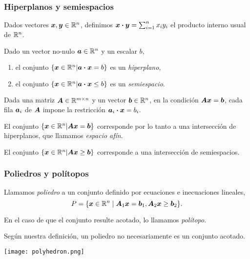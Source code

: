 \documentclass[aspectratio=169,12pt,spanish]{beamer}
\begin{document}

\begin{frame}
\frametitle{Hiperplanos y semiespacios}

Dados vectores $\bm{x}, \bm{y} \in \mathbb{R}^n$, definimos $\bm{x} \boldsymbol{\cdot} \bm{y} = \sum_{i=1}^n x_i y_i$ el producto interno usual de $\mathbb{R}^n$.

\begin{definition}
Dado un vector no-nulo $\bm{a} \in \mathbb{R}^n$ y un escalar $b$,
  \begin{enumerate}
  \item el conjunto $\{\bm{x} \in \mathbb{R}^n | \bm{a} \boldsymbol{\cdot} \bm{x} = b\}$ es un \emph{hiperplano},
  \item el conjunto $\{\bm{x} \in \mathbb{R}^n | \bm{a} \boldsymbol{\cdot} \bm{x} \le b\}$ es un \emph{semiespacio}.
  \end{enumerate}
\end{definition}

Dada una matriz $\bm{A} \in \mathbb{R}^{m \times n}$ y un vector $\bm{b} \in \mathbb{R}^n$, en la condición $\bm{A} \bm{x} = \bm{b}$, cada fila $\bm{a}_i$ de $\bm{A}$ impone la restricción $\bm{a}_i \boldsymbol{\cdot} \bm{x} = b_i$. 

El conjunto $\{\bm{x} \in \mathbb{R}^n | \bm{A} \bm{x} = \bm{b}\}$ corresponde por lo tanto a una intersección de hiperplanos, que llamamos \emph{espacio afín}.

El conjunto $\{\bm{x} \in \mathbb{R}^n | \bm{A} \bm{x} \ge \bm{b}\}$ corresponde a una intersección de semiespacios.


\end{frame}


\begin{frame}
\frametitle{Poliedros y polítopos}

Llamamos \emph{poliedro} a un conjunto definido por ecuaciones e inecuaciones lineales,
$$
P = \{\bm{x} \in \mathbb{R}^n \mid \bm{A}_1 \bm{x} = \bm{b}_1, \bm{A}_2 \bm{x} \ge \bm{b}_2\}.
$$

En el caso de que el conjunto resulte acotado, lo llamamos \emph{pol\'itopo}.

Según nuestra definición, un poliedro no  necesariamente es un conjunto acotado.

\begin{center}
\texttt{[image: polyhedron.png]}
\end{center}

\end{frame}
\end{document}
